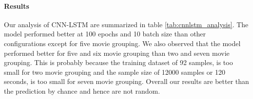 \paragraph{Results} Our analysis of CNN-LSTM are summarized in table \ref{tab:cnnlstm_analysis}. The model performed better at 100 epochs and 10 batch size than other configurations except for five movie grouping. We also observed that the model performed better for five and six movie grouping than two and seven movie grouping. This is probably because the training dataset of 92 samples, is too small for two movie grouping and the sample size of 12000 samples or 120 seconds, is too small for seven movie grouping. Overall our results are better than the prediction by chance and hence are not random.  
\begin{center}
\label{tab:cnnlstm_analysis}
\end{center}

